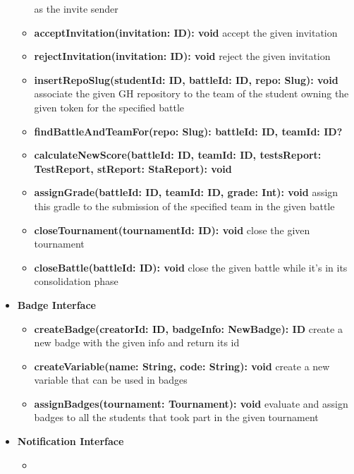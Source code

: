 \begin{itemize}
\begin{itemize}
                    as the invite sender
              \item \textbf{acceptInvitation(invitation: ID): void}
                    accept the given invitation
              \item \textbf{rejectInvitation(invitation: ID): void}
                    reject the given invitation
              \item \textbf{insertRepoSlug(studentId: ID, battleId: ID, repo: Slug): void }
                    associate the given GH repository to the team of the student owning the given token for the
                    specified battle
              \item \textbf{findBattleAndTeamFor(repo: Slug): {battleId: ID, teamId: ID}? }
              \item \textbf{calculateNewScore(battleId: ID, teamId: ID, testsReport: TestReport, stReport: StaReport): void }
              \item \textbf{assignGrade(battleId: ID, teamId: ID, grade: Int): void }
                    assign this gradle to the submission of the specified team in the given battle
              \item \textbf{closeTournament(tournamentId: ID): void }
                    close the given tournament
              \item \textbf{closeBattle(battleId: ID): void }
                    close the given battle while it's in its consolidation phase
          \end{itemize}
    \item \textbf{Badge Interface}
          \begin{itemize}
              \item \textbf{createBadge(creatorId: ID, badgeInfo: NewBadge): ID}
                    create a new badge with the given info and return its id
              \item \textbf{createVariable(name: String, code: String): void}
                    create a new variable that can be used in badges
              \item \textbf{assignBadges(tournament: Tournament): void}
                    evaluate and assign badges to all the students that took part in the given tournament
          \end{itemize}
    \item \textbf{Notification Interface}
          \begin{itemize}
              \item
          \end{itemize}

\end{itemize}
